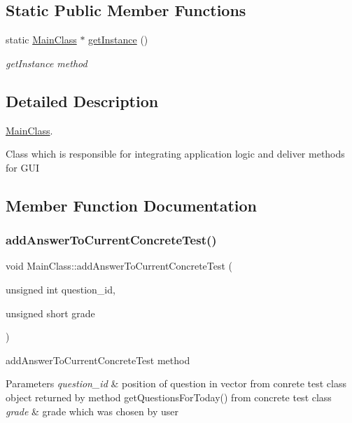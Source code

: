 \subsection*{Static Public Member Functions}
\begin{DoxyCompactItemize}
\item 
static \hyperlink{class_main_class}{Main\+Class} $\ast$ \hyperlink{class_main_class_a9b4a4cac62c4e8613b9ec63d6686eb8c}{get\+Instance} ()
\begin{DoxyCompactList}\small\item\em get\+Instance method \end{DoxyCompactList}\end{DoxyCompactItemize}


\subsection{Detailed Description}
\hyperlink{class_main_class}{Main\+Class}. 

Class which is responsible for integrating application logic and deliver methods for G\+UI 

\subsection{Member Function Documentation}
\mbox{\label{class_main_class_a2bc7d95eab87498c7afdaf7f34ab9a4e}} 
\subsubsection{\texorpdfstring{add\+Answer\+To\+Current\+Concrete\+Test()}{addAnswerToCurrentConcreteTest()}}
{\footnotesize\ttfamily void Main\+Class\+::add\+Answer\+To\+Current\+Concrete\+Test (\begin{DoxyParamCaption}\item[{unsigned int}]{question\+\_\+id,  }\item[{unsigned short}]{grade }\end{DoxyParamCaption})}



add\+Answer\+To\+Current\+Concrete\+Test method 


\begin{DoxyParams}{Parameters}
{\em question\+\_\+id} & position of question in vector from conrete test class object returned by method get\+Questions\+For\+Today() from concrete test class \\
\hline
{\em grade} & grade which was chosen by user \\
\hline
\end{DoxyParams}

